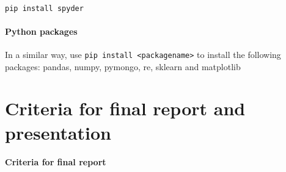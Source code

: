 \documentclass[a4paper]{report}
\begin{document}
\\
{\small\texttt{pip install spyder}}

\paragraph{Python packages}
In a similar way, use {\small\texttt{pip install
{\textless}packagename{\textgreater}}} to install the following
packages: pandas, numpy, pymongo, re, sklearn and matplotlib 



\section*{Criteria for final report and presentation}

\paragraph{Criteria for final report}
\end{document}
